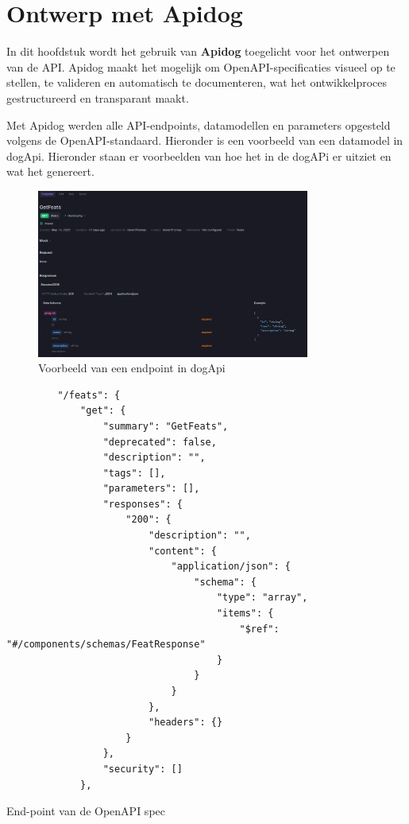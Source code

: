 \chapter{Ontwerp met Apidog}
\label{ch:apidog}

In dit hoofdstuk wordt het gebruik van \textbf{Apidog} toegelicht voor het ontwerpen van de API. Apidog maakt het mogelijk om OpenAPI-specificaties visueel op te stellen, te valideren en automatisch te documenteren, wat het ontwikkelproces gestructureerd en transparant maakt.


Met Apidog werden alle API-endpoints, datamodellen en parameters opgesteld volgens de OpenAPI-standaard. Hieronder is een voorbeeld van een datamodel in dogApi. Hieronder staan er voorbeelden van hoe het in de dogAPi er uitziet en wat het genereert.



\begin{figure}
    \centering
    \includegraphics[width=0.8\textwidth]{end-point-voorbeeld.png}
    \caption[Voorbeeld end-point.]{\label{fig:end-point-voorbeeld}Voorbeeld van een endpoint in dogApi}
\end{figure}

\begin{listing}
    \begin{verbatim}
         "/feats": {
             "get": {
                 "summary": "GetFeats",
                 "deprecated": false,
                 "description": "",
                 "tags": [],
                 "parameters": [],
                 "responses": {
                     "200": {
                         "description": "",
                         "content": {
                             "application/json": {
                                 "schema": {
                                     "type": "array",
                                     "items": {
                                         "$ref": "#/components/schemas/FeatResponse"
                                     }
                                 }
                             }
                         },
                         "headers": {}
                     }
                 },
                 "security": []
             },
    \end{verbatim}
    \caption[openAPIEndPoint]{End-point van de OpenAPI spec}
\end{listing}


